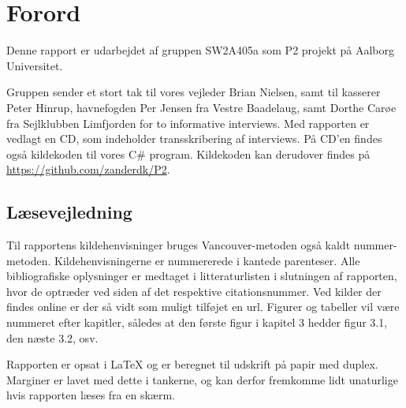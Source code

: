 \chapter*{Forord}
Denne rapport er udarbejdet af gruppen SW2A405a som P2 projekt på Aalborg Universitet.


Gruppen sender et stort tak til vores vejleder Brian Nielsen, samt til kasserer Peter Hinrup, havnefogden Per Jensen fra Vestre Baadelaug, samt Dorthe Carøe fra Sejlklubben Limfjorden for to informative interviews.
Med rapporten er vedlagt en CD, som indeholder transskribering af interviews. På CD'en findes  også kildekoden til vores C\# program. Kildekoden kan derudover findes på \url{https://github.com/zanderdk/P2}.

\section{Læsevejledning}
Til rapportens kildehenvisninger bruges Vancouver-metoden også kaldt nummer-metoden. Kildehenvisningerne er nummererede i kantede parenteser. Alle bibliografiske oplysninger er medtaget i litteraturlisten i slutningen af rapporten, hvor de optræder ved siden af det respektive citationsnummer. Ved kilder der findes online er der så vidt som muligt tilføjet en url. Figurer og tabeller vil være nummeret efter kapitler, således at den første figur i kapitel 3 hedder figur 3.1, den næste 3.2, osv.	

Rapporten er opsat i \LaTeX{} og er beregnet til udskrift på papir med duplex. Marginer er lavet med dette i tankerne, og kan derfor fremkomme lidt unaturlige hvis rapporten læses fra en skærm.
